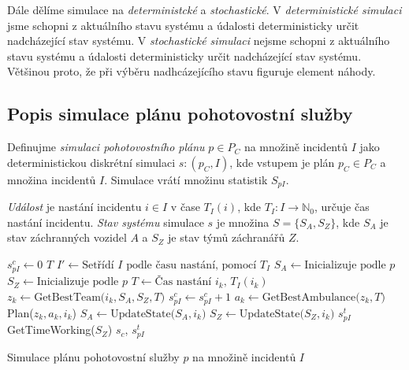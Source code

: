 Dále dělíme simulace na \textit{deterministcké} a \textit{stochastické}.
V \textit{deterministické simulaci} jsme schopni z aktuálního stavu systému a údalosti deterministicky určit nadcházející stav systému.
V \textit{stochastické simulaci} nejsme schopni z aktuálního stavu systému a údalosti deterministicky určit nadcházející stav systému.
Většinou proto, že při výběru nadhcázejícího stavu figuruje element náhody.
\cite{SimulaceBook}

\subsection{Popis simulace plánu pohotovostní služby}\label{kap:definiceSimulace}

\begin{definice}
  Definujme \textit{simulaci pohotovostního plánu} $p \in P_C$ na množině incidentů $I$ jako deterministickou diskrétní simulaci
  $s \colon (p_C, I)$, kde vstupem je plán $p_C \in P_C$ a množina incidentů $I$.
  Simulace vrátí množinu statistik $S_{pI}$.
\end{definice}

\textit{Událost} je nastání incidentu $i \in I$ v čase $T_I(i)$, kde $T_I \colon I \rightarrow \mathbb{N}_0$, určuje čas nastání incidentu.
\textit{Stav systému} simulace $s$ je množina $S = \{ S_A, S_Z \}$, kde $S_A$ je stav záchranných vozidel $A$ a $S_Z$ je stav týmů záchranářů $Z$. 

\begin{algorithm}[h]
  \begin{algorithmic}[1]
    \State $s^{c}_{pI} \gets 0$
    \State $T$ 
    \State $I' \gets \mbox{Setřídí $I$ podle času nastání, pomocí $T_I$}$
    \State $S_A \gets \mbox{Inicializuje podle $p$}$
    \State $S_Z \gets \mbox{Inicializuje podle $p$}$
      \State $T \gets \mbox{Čas nastání $i_k$, $T_I(i_k)$}$
      \State $z_k \gets \mbox{GetBestTeam($i_k, S_A, S_Z, T$)}$
        \State $s^{c}_{pI} \gets s^{c}_{pI} + 1$
        \State $a_k \gets \mbox{GetBestAmbulance($z_k, T$)}$
        \State Plan($z_k, a_k, i_k$)
      \EndIf
      \State $S_A \gets \mbox{UpdateState($S_A, i_k$)}$
      \State $S_Z \gets \mbox{UpdateState($S_Z, i_k$)}$
    \EndFor
    \State $s^t_{pI}$ \gets \mbox{GetTimeWorking($S_Z$)}
    \State \Return $s_{c}$, $s^t_{pI}$
  \EndFunction
  \end{algorithmic}
  \caption{Simulace plánu pohotovostní služby $p$ na množině incidentů $I$}
  \label{simulaceAlgo}
\end{algorithm}

